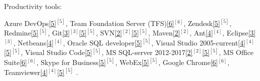 \begin{cventries}
  \cventry
    {Productivity tools:} %
    {} %
    {} %
    {} %
    {
      \begin{cvitems} %
        \item {        
        Azure DevOps\ref{5}{$^{[5]}$},         
        Team Foundation Server (TFS)\ref{6}{$^{[6]}$},
        Zendesk\ref{5}{$^{[5]}$},
        Redmine\ref{5}{$^{[5]}$},  
        Git\ref{3}{$^{[3]}$}\ref{5}{$^{[5]}$}, 
        SVN\ref{2}{$^{[2]}$}\ref{5}{$^{[5]}$},
        Maven\ref{2}{$^{[2]}$},
        Ant\ref{4}{$^{[4]}$},  
        Eclipse\ref{3}{$^{[3]}$},  
        Netbeans\ref{4}{$^{[4]}$}, 
        Oracle SQL developer\ref{5}{$^{[5]}$},
        Visual Studio 2005-current\ref{4}{$^{[4]}$}\ref{5}{$^{[5]}$},
        Visual Studio Code\ref{5}{$^{[5]}$},
        MS SQL-server 2012-2017\ref{2}{$^{[2]}$}\ref{5}{$^{[5]}$},
        MS Office Suite\ref{6}{$^{[6]}$},
        Skype for Business\ref{5}{$^{[5]}$},
        WebEx\ref{5}{$^{[5]}$},
        Google Chrome\ref{6}{$^{[6]}$},        
        Teamviewer\ref{4}{$^{[4]}$}\ref{5}{$^{[5]}$}%
        .}       
      \end{cvitems}
    }  
  \vspace{-0.4cm}  
    

\end{cventries}
